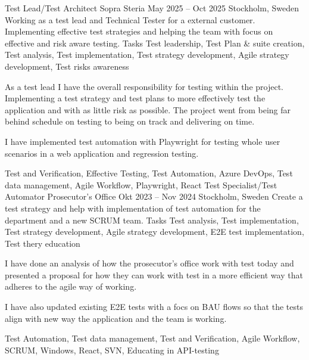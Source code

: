 \documentclass{sobCV}[2015/09/08]
\begin{document}
\experiencenode
{Test Lead/Test Architect}
{Sopra Steria}
{May 2025 -- Oct 2025}
{Stockholm, Sweden}{
	Working as a test lead and Technical Tester for a external customer.
	Implementing effective test strategies and helping the team with focus
	on effective and risk aware testing.
}
{Tasks}{
	Test leadership,
	Test Plan \& suite creation,
	Test analysis,
	Test implementation,
	Test strategy development,
	Agile strategy development,
	Test risks awareness
}{  %
	{
		As a test lead I have the overall responsibility for testing within the
		project. Implementing a test strategy and test plans to more
		effectively test the application and with as little risk as possible.
		The project went from being far behind schedule on testing to being on
		track and delivering on time.

		I have implemented test automation with Playwright for testing whole
		user scenarios in a web application and regression testing.

	}
}{
	Test and Verification,
	Effective Testing,
	Test Automation,
	Azure DevOps,
	Test data management,
	Agile Workflow,
	Playwright,
	React
}
\experiencenode
{Test Specialist/Test Automator}
{Prosecutor's Office}
{Okt 2023 -- Nov 2024}
{Stockholm, Sweden}{
	Create a test strategy and help with implementation of test automation
	for the department and a new SCRUM team.
}
{Tasks}{
	Test analysis,
	Test implementation,
	Test strategy development,
	Agile strategy development,
	E2E test implementation,
	Test thery education
}{  %
	{
		I have done an analysis of how the prosecutor's office work with test
		today and presented a proposal for how they can work with test in a more
		efficient way that adheres to the agile way of working.

		I have also updated existing E2E tests with a focs on BAU flows so that
		the tests align with new way the application and the team is working.

	}
}{
	Test Automation,
	Test data management,
	Test and Verification,
	Agile Workflow,
	SCRUM,
	Windows,
	React,
	SVN,
	Educating in API-testing
}
\end{document}
